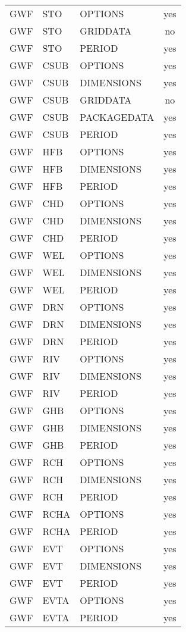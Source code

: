 \begin{longtable}{p{1.5cm} p{1.5cm} p{3cm} c}
\hline
GWF & STO & OPTIONS & yes \\ 
GWF & STO & GRIDDATA & no \\ 
GWF & STO & PERIOD & yes \\ 
\hline
GWF & CSUB & OPTIONS & yes \\ 
GWF & CSUB & DIMENSIONS & yes \\ 
GWF & CSUB & GRIDDATA & no \\ 
GWF & CSUB & PACKAGEDATA & yes \\ 
GWF & CSUB & PERIOD & yes \\ 
\hline
GWF & HFB & OPTIONS & yes \\ 
GWF & HFB & DIMENSIONS & yes \\ 
GWF & HFB & PERIOD & yes \\ 
\hline
GWF & CHD & OPTIONS & yes \\ 
GWF & CHD & DIMENSIONS & yes \\ 
GWF & CHD & PERIOD & yes \\ 
\hline
GWF & WEL & OPTIONS & yes \\ 
GWF & WEL & DIMENSIONS & yes \\ 
GWF & WEL & PERIOD & yes \\ 
\hline
GWF & DRN & OPTIONS & yes \\ 
GWF & DRN & DIMENSIONS & yes \\ 
GWF & DRN & PERIOD & yes \\ 
\hline
GWF & RIV & OPTIONS & yes \\ 
GWF & RIV & DIMENSIONS & yes \\ 
GWF & RIV & PERIOD & yes \\ 
\hline
GWF & GHB & OPTIONS & yes \\ 
GWF & GHB & DIMENSIONS & yes \\ 
GWF & GHB & PERIOD & yes \\ 
\hline
GWF & RCH & OPTIONS & yes \\ 
GWF & RCH & DIMENSIONS & yes \\ 
GWF & RCH & PERIOD & yes \\ 
\hline
GWF & RCHA & OPTIONS & yes \\ 
GWF & RCHA & PERIOD & yes \\ 
\hline
GWF & EVT & OPTIONS & yes \\ 
GWF & EVT & DIMENSIONS & yes \\ 
GWF & EVT & PERIOD & yes \\ 
\hline
GWF & EVTA & OPTIONS & yes \\ 
GWF & EVTA & PERIOD & yes \\ 

\end{longtable}
